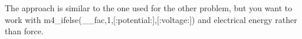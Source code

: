 The approach is similar to the one used for the other problem, but you
want to work with m4_ifelse(__fac,1,[:potential:],[:voltage:]) and electrical energy rather than force. 



